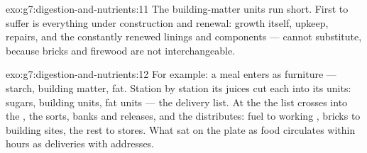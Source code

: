 \begin{solution}{exo:g7:digestion-and-nutrients:11}
The building-matter units run short. First to suffer is
everything under construction and renewal: growth
itself,  upkeep, repairs, and the constantly
renewed linings and  components --- 
cannot substitute, because bricks and firewood are not
interchangeable.
\end{solution}

\begin{solution}{exo:g7:digestion-and-nutrients:12}
For example: a meal enters as furniture --- starch,
building matter, fat. Station by station its juices cut
each into its units: sugars, building units, fat units
--- the delivery list. At the  the list crosses
into the , the  sorts, banks and releases,
and the  distributes: fuel to working ,
bricks to building sites, the rest to stores. What sat
on the plate as food circulates within hours as
deliveries with addresses.
\end{solution}

